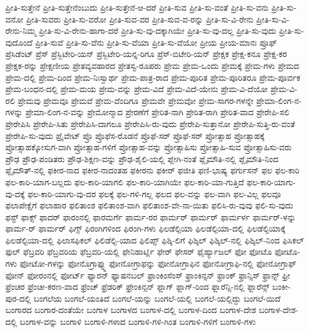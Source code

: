 {ಪ್ರೀತಿ-ಸುತ್ತೇನೆ
ಪ್ರೀತಿ-ಸುತ್ತೇನೆಂಬುದು
ಪ್ರೀತಿ-ಸುತ್ತೇನೆ-ಆ-ದರೆ
ಪ್ರೀತಿ-ಸುವ
ಪ್ರೀತಿ-ಸು-ವಂತೆ
ಪ್ರೀತಿ-ಸು-ವನು
ಪ್ರೀತಿ-ಸು-ವನೋ
ಪ್ರೀತಿ-ಸುವರು
ಪ್ರೀತಿ-ಸು-ವರೋ
ಪ್ರೀತಿ-ಸುವ-ವರ
ಪ್ರೀತಿ-ಸುವ-ವ-ರನ್ನು
ಪ್ರೀತಿ-ಸು-ವಿ-ರೇನು
ಪ್ರೀತಿ-ಸು-ವಿ-ರೇನು-ನಿಮ್ಮ
ಪ್ರೀತಿ-ಸು-ವಿ-ರೇನು-ಹಾಗಾ-ದರೆ
ಪ್ರೀತಿ-ಸು-ವು-ದಕ್ಕಾಗಿಯೇ
ಪ್ರೀತಿ-ಸು-ವು-ದಲ್ಲ
ಪ್ರೀತಿ-ಸು-ವುದು
ಪ್ರೀತಿ-ಸು-ವುದೊಂದೆ
ಪ್ರೀತಿ-ಸುವೆ
ಪ್ರೀತಿ-ಸು-ವೆನು
ಪ್ರೀತಿ-ಸು-ವೆಯಾ
ಪ್ರೀತಿ-ಸು-ವೆಯೋ
ಪ್ರೀಯ
ಪ್ರೀಯ-ಮಾನಃ
ಪ್ರೂಫ್
ಪ್ರೆಸಿಡೆಂಟ್
ಪ್ರೆಸ್
ಪ್ರೆಸ್ಬಿಟೇರಿ-ಯನ್
ಪ್ರೆಸ್ಬಿಟೇರಿ-ಯನ್ನ-ರಿಗೂ
ಪ್ರೆಸ್-ಬಿಟೇರಿ-ಯನ್
ಪ್ರೇಕ್ಷಕ
ಪ್ರೇಕ್ಷ-ಕನೂ
ಪ್ರೇಕ್ಷ-ಕರ
ಪ್ರೇಕ್ಷಕ-ರನ್ನು
ಪ್ರೇಕ್ಷಣೀಯ
ಪ್ರೇತವ್ಯವಹಾರದ
ಪ್ರೇತಸ್ವ-ರೂಪರು
ಪ್ರೇಮ
ಪ್ರೇಮ-ಒಂದು
ಪ್ರೇಮಕ್ಕೆ
ಪ್ರೇಮ-ಗಳು
ಪ್ರೇಮದ
ಪ್ರೇಮ-ದಲ್ಲಿ
ಪ್ರೇಮ-ದಿಂದ
ಪ್ರೇಮ-ನಿಃಸ್ವಾರ್ಥ
ಪ್ರೇಮ-ಪಾತ್ರ-ರಾದ
ಪ್ರೇಮ-ಪೂರಿತ
ಪ್ರೇಮ-ಪೂರಿತರೂ
ಪ್ರೇಮ-ಪೂರ್ವಕ
ಪ್ರೇಮ-ಬಂಧನ-ದಲ್ಲಿ
ಪ್ರೇಮ-ಮಯ
ಪ್ರೇಮ-ವನ್ನು
ಪ್ರೇಮ-ವಿದೆ
ಪ್ರೇಮ-ವಿದೆ-ಯೇನು
ಪ್ರೇಮ-ವಿ-ದೆಯೋ
ಪ್ರೇಮ-ವಿ-ರಲಿ
ಪ್ರೇಮವು
ಪ್ರೇಮವೂ
ಪ್ರೇಮವೆ
ಪ್ರೇಮ-ವೆಂದಿಗೂ
ಪ್ರೇಮವೇ
ಪ್ರೇಮವೋ
ಪ್ರೇಮ-ಸಾಗರ-ಗಳನ್ನೇ
ಪ್ರೇಮಾ-ಲಿಂಗ-ನ-ಗಳನ್ನು
ಪ್ರೇಮಾ-ಲಿಂಗ-ನ-ವನ್ನು
ಪ್ರೇಮೋನ್ಮಾದ
ಪ್ರೇರಣೆಗೆ
ಪ್ರೇರಿತ-ನಾಗಿ
ಪ್ರೇರಿತ-ರಾಗಿ
ಪ್ರೇರಿತ-ವಾದ
ಪ್ರೇರೇಪಿ-ಸಲಿ
ಪ್ರೇರೇಪಿಸಿ
ಪ್ರೇರೇಪಿ-ಸಿತು
ಪ್ರೇರೇಪಿಸಿ-ದಾಗಲೂ
ಪ್ರೇರೇಪಿಸಿ-ರು-ವುದು
ಪ್ರೇರೇಪಿ-ಸುತ್ತಾನೋ
ಪ್ರೇರೇಪಿ-ಸುತ್ತಿ-ರು-ವಂತೆ
ಪ್ರೇರೇಪಿ-ಸು-ವುದು
ಪ್ರೈವೇಟ್
ಪ್ರೊ
ಪ್ರೊಫೆಸ-ರೊಡನೆ
ಪ್ರೊಫೆ-ಸರ್
ಪ್ರೊಫೆ-ಸರ್
ಪ್ರೋತ್ಸಾಹ
ಪ್ರೋತ್ಸಾಹಕ್ಕೆ
ಪ್ರೋತ್ಸಾಹಕ್ಕೋಸುಗ-ವಾಗಿ
ಪ್ರೋತ್ಸಾಹ-ಗಳಿಗೆ
ಪ್ರೋತ್ಸಾಹ-ವನ್ನು
ಪ್ರೋತ್ಸಾಹಿಸು
ಪ್ರೋತ್ಸಾಹಿ-ಸುವ
ಪ್ರೋತ್ಸಾಹಿಸು-ವರು
ಪ್ರೌಢ
ಪ್ರೌಢ-ಪಂಡಿತರು
ಪ್ರೌಢ-ಶಿಕ್ಷಣ-ವನ್ನು
ಪ್ರೌಢ-ಶೈಲಿ-ಯಲ್ಲಿ
ಪ್ಲೇಗಿ-ನಂತೆ
ಪ್ಲೈಮೌತಿ-ನಲ್ಲಿ
ಪ್ಲೈಮೌತಿ-ನಿಂದ
ಪ್ಲೈಮೌತ್-ನಲ್ಲಿ
ಫಕೀರ-ನಾದ
ಫಕೀರ-ನಾದಂತಹ
ಫಕೀರನು
ಫಕೀರ್
ಫಜೀತಿ
ಫಣಿ-ಭಾಷ್ಯ
ಫರ್ಗುಸನ್
ಫಲ
ಫಲ-ಕಾರಿ
ಫಲ-ಕಾರಿ-ಯಾಗ-ಬಲ್ಲದು
ಫಲ-ಕಾರಿ-ಯಾಗಲಿ
ಫಲ-ಕಾರಿ-ಯಾಗಿಯೇ
ಫಲ-ಕಾರಿ-ಯಾ-ಗುತ್ತಿದೆ
ಫಲ-ಕಾರಿ-ಯಾಗು-ವು-ದಕ್ಕೆ
ಫಲ-ಕಾರಿ-ಯಾಗು-ವು-ದರ
ಫಲಕ್ಕೆ
ಫಲ-ಗಳಿ-ಗಲ್ಲ
ಫಲದ
ಫಲ-ವನ್ನು
ಫಲ-ವಾಗಿ
ಫಲ-ವಿಲ್ಲ
ಫಲವೂ
ಫಲಾಪೇಕ್ಷೆಗೆ
ಫಲಾಹಾರ
ಫಲಿತಾಂಶ
ಫಲಿತಾಂಶ-ವಾಗಿ
ಫಲಿತಾಂಶ-ವೇ-ನಾ-ಯಿತು
ಫಲಿಸಿ-ರು-ವುವು
ಫಲಿ-ಸು-ವುದು
ಫಸ್ಟ್
ಫಾಕ್ಸ್
ಫಾದರ್
ಫಾರಂನಲ್ಲಿ
ಫಾರಮರ್ಗೆ
ಫಾರ್ಮ-ರರ
ಫಾರ್ಮರ್
ಫಾರ್ಮರ್
ಫಾರ್ಮರ್ಳ
ಫಾರ್ಮರ್-ಳನ್ನು
ಫಾರ್ಮ-ರ್
ಫಾರ್ಮರ್
ಫಿಗ್ಸ್
ಫಿರಂಗಿಗಳಿಂದ
ಫಿರಂಗಿ-ಗಳು
ಫಿಲಡೆಲ್ಪಿಯಾ
ಫಿಲಡೆಲ್ಪಿಯಾ-ದಲ್ಲಿ
ಫಿಲಡೆಲ್ಫಿಯಾಕ್ಕೆ
ಫಿಲಡೆಲ್ಫಿಯಾ-ದಲ್ಲಿ
ಫಿಲಾಸಫಿಕಲ್
ಫಿಲಿಡೆಲ್ಫಿ-ಯಾದ
ಫಿಲಿಪ್ಸ್
ಫಿಶ್ಕಿ-ಲಿಗೆ
ಫಿಶ್ಕಿಲ್
ಫಿಶ್ಕಿಲ್-ನಲ್ಲಿ
ಫಿಶ್ಕಿಲ್-ನಿಂದ
ಫಿಸಿಕಲ್
ಫುಲ್
ಫೆಬ್ರವರಿ
ಫೆಬ್ರವರಿಯ
ಫೆಬ್ರವರಿ-ಯಲ್ಲಿ
ಫೇನಿಹಾರ್ಟ್ಲಿ
ಫೇರ್
ಫೇಸರ್
ಫೈರ್ಹ್ಯಾಜಲ್
ಫೋ
ಫೋಟೊ
ಫೋಟೊ-ಗಳು
ಫೋಟೋ-ಗಳನ್ನು
ಫೋನೊಗ್ರಾಫ್ನ್ನು
ಫೋನೋಗ್ರಾಫನ್ನು
ಫೋನೋಗ್ರಾಫಿನ
ಫೋನೋಗ್ರಾಫಿ-ನಲ್ಲಿ
ಫೋನೋಗ್ರಾಫ್
ಫೋನ್
ಫೋರಂನಲ್ಲಿ
ಫೋರ್ಟ್
ಫ್ಯಾರನ್
ಫ್ಯಾಷನಬಲ್
ಫ್ರಾಂಕಿಂಸೆಂಸ್
ಫ್ರಾಂಕಿನ್ಸನ್
ಫ್ರಾಂಕ್
ಫ್ರಾನ್ಸಿಸ್
ಫ್ರಾನ್ಸ್
ಫ್ರೀ
ಫ್ರೆಂಚರ
ಫ್ರೆಂಚೀ-ಕರಣ-ವಾದ
ಫ್ರೆಂಚ್
ಫ್ರೆಡರಿಕ್
ಫ್ರೇಂಕಿನ್ಸನ್
ಫ್ಲಾಗ್
ಫ್ಲಾಗ್-ರಿಂದ
ಫ್ಲಾರೆನ್ಸಿ-ನಲ್ಲಿ
ಫ್ಲಾರೆನ್ಸ್
ಬಂಕೀ-ಪುರ-ದಲ್ಲಿ
ಬಂಗಲೆಯ
ಬಂಗಲೆ-ಯಂತಿದೆ
ಬಂಗಲೆ-ಯನ್ನು
ಬಂಗಲೆ-ಯಲ್ಲಿ
ಬಂಗಲೆ-ಯಲ್ಲಿದ್ದು
ಬಂಗಲೆ-ಯಿದೆ
ಬಂಗಾರದ
ಬಂಗಾರ-ದಂತೆಯೇ
ಬಂಗಾಳ
ಬಂಗಾಳದ
ಬಂಗಾಳ-ದಲ್ಲಿ
ಬಂಗಾಳ-ದಿಂದ
ಬಂಗಾಳ-ದೇಶ
ಬಂಗಾಳ-ದೇಶ-ದಲ್ಲಿ
ಬಂಗಾಳ-ವನ್ನು
ಬಂಗಾಳಿ
ಬಂಗಾಳಿ-ಗಳಾದ
ಬಂಗಾಳಿ-ಗಳಿ-ಗಿಂತ
ಬಂಗಾಳಿ-ಗಳಿಗೆ
ಬಂಗಾಳಿ-ಗಳು
}

